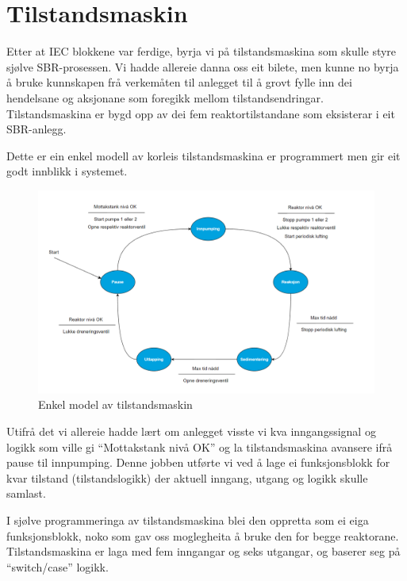 \section{Tilstandsmaskin}
\thispagestyle{fancy}

Etter at \gls{IEC} blokkene var ferdige, byrja vi på tilstandsmaskina som skulle styre sjølve \gls{SBR}-prosessen. 
Vi hadde allereie danna oss eit bilete, men kunne no byrja å bruke kunnskapen frå verkemåten til anlegget
til å grovt fylle inn dei hendelsane og aksjonane som foregikk mellom tilstandsendringar. 
Tilstandsmaskina er bygd opp av dei fem reaktortilstandane som eksisterar i eit \gls{SBR}-anlegg.

Dette er ein enkel modell av korleis tilstandsmaskina er programmert men gir eit godt innblikk i systemet.

\begin{figure}[htbp]
    \centering
    \includegraphics[width=1\textwidth]{Figurar/Simpel tilstandsmaskin.png}
    \caption{Enkel model av tilstandsmaskin}\label{fig:SimpelTilstandsmaskin}
\end{figure}

Utifrå det vi allereie hadde lært om anlegget visste vi kva inngangssignal og logikk som ville gi
``Mottakstank nivå OK'' og la tilstandsmaskina avansere ifrå pause til innpumping. Denne jobben utførte vi ved å lage ei
funksjonsblokk for kvar tilstand (tilstandslogikk) der aktuell inngang, utgang og logikk skulle samlast.

\newpage

I sjølve programmeringa av tilstandsmaskina blei den oppretta som ei eiga funksjonsblokk, noko som gav oss moglegheita å bruke den for begge reaktorane.
Tilstandsmaskina er laga med fem inngangar og seks utgangar, og baserer seg på ``switch/case'' logikk.


